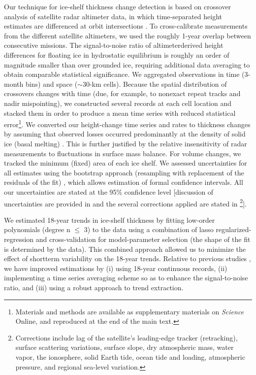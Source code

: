 Our technique for ice-shelf thickness change detection is based on crossover
analysis of satellite radar altimeter data, in which time-separated height 
estimates are differenced at orbit intersections \parencite{Zwally2005, 
Davis2004, Wingham2009}. To cross-calibrate measurements from the different 
satellite altimeters, we used the roughly 1-year overlap between consecutive
missions. The signal-to-noise ratio of altimeterderived height differences for
floating ice in hydrostatic equilibrium is roughly an order of magnitude 
smaller than over grounded ice, requiring additional data averaging to obtain
comparable statistical significance. We aggregated observations in time 
(3-month bins) and space ($\sim$30-km cells). Because the spatial distribution
of crossovers changes with time (due, for example, to nonexact repeat tracks
and nadir mispointing), we constructed several records at each cell location
and stacked them in order to produce a mean time series with reduced
statistical error\footnote{\label{SM}Materials and methods are available as 
supplementary materials on {\it Science} Online, and reproduced at the end of
the main text.}. We converted our height-change time series and rates to
thickness changes by assuming that observed losses occurred predominantly at
the density of solid ice (basal melting) \parencite{Shepherd2010,
Pritchard2012, Wingham2009}. This is further justified by the relative
insensitivity of radar measurements to fluctuations in surface mass 
balance\footnotemark[1]. For volume changes, we tracked the minimum (fixed) area of
each ice shelf\footnotemark[1]. We assessed uncertainties for all estimates using
the bootstrap approach (resampling with replacement of the residuals of the
fit) \parencite{Efron1993}, which allows estimation of formal confidence
intervals. All our uncertainties are stated at the 95\% confidence level 
[discussion of uncertainties are provided in \footnotemark[1] and the several
corrections applied are stated in \footnote{Corrections include lag of the
satellite's leading-edge tracker (retracking), surface scattering variations,
surface slope, dry atmospheric mass, water vapor, the ionosphere, solid Earth
tide, ocean tide and loading, atmospheric pressure, and regional sea-level
variation\footnotemark[1].}].

We estimated 18-year trends in ice-shelf thickness by fitting low-order 
polynomials (degree n $\leqslant$ 3) to the data using a combination of lasso
regularized-regression \parencite{Tibshirani1996} and cross-validation for
model-parameter selection (the shape of the fit is determined by the data).
This combined approach allowed us to minimize the effect of shortterm
variability on the 18-year trends. Relative to previous studies
\parencite{Shepherd2010, Pritchard2012, Zwally2005, Fricker2012}, we have
improved estimations by (i) using 18-year continuous records, (ii) implementing
a time series averaging scheme so as to enhance the signal-to-noise ratio, and
(iii) using a robust approach to trend extraction.

